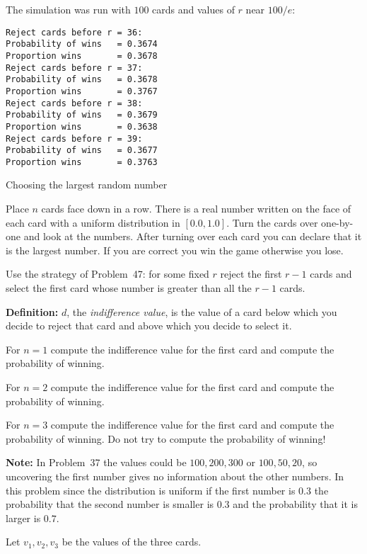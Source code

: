\sml{}
The simulation was run with $100$ cards and values of $r$ near $100/e$:
\begin{verbatim}
Reject cards before r = 36:
Probability of wins   = 0.3674
Proportion wins       = 0.3678
Reject cards before r = 37:
Probability of wins   = 0.3678
Proportion wins       = 0.3767
Reject cards before r = 38:
Probability of wins   = 0.3679
Proportion wins       = 0.3638
Reject cards before r = 39:
Probability of wins   = 0.3677
Proportion wins       = 0.3763
\end{verbatim}


\begin{prob}{Choosing the largest random number}

Place $n$ cards face down in a row. There is a real number  written on the face of each card with a uniform distribution in $[0.0,1.0]$. Turn the cards over one-by-one and look at the numbers. After turning over each card you can declare that it is the largest number. If you are correct you win the game otherwise you lose. 

Use the strategy of Problem~47: for some fixed $r$ reject the first $r-1$ cards and select the first card whose number is greater than all the $r-1$ cards.

\textbf{Definition:} $d$, the \emph{indifference value}, is the value of a card below which you decide to reject that card and above which you decide to select it.

 For $n=1$ compute the indifference value for the first card and compute the probability of winning.

 For $n=2$ compute the indifference value for the first card and compute the probability of winning.

 For $n=3$ compute the indifference value for the first card and compute the probability of winning. Do not try to compute the probability of winning!

\textbf{Note:} In Problem~37 the values could be $100, 200, 300$ or $100, 50, 20$, so uncovering the first number gives no information about the other numbers. In this problem since the distribution is uniform if the first number is $0.3$ the probability that the second number is smaller is $0.3$ and the probability that it is larger is $0.7$.
\end{prob}

\solution{}

Let $v_1,v_2,v_3$ be the values of the three cards.

